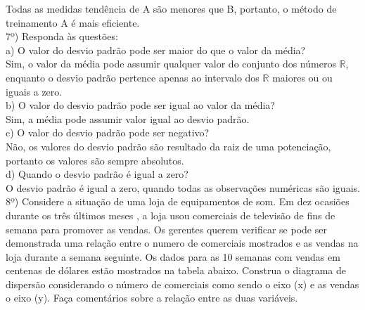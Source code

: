 \documentclass[12pt,a4paper]{article}
\begin{document}
	\vspace{0.5cm}
	Todas as medidas tendência de A são menores que B, portanto, o método de treinamento A é mais eficiente.
	\vspace{1cm}\\
	7º) Responda às questões:\\
	a) O valor do desvio padrão pode ser maior do que o valor da média?
	\vspace{0.5cm}\\
	Sim, o valor da média pode assumir qualquer valor do conjunto dos números  $\mathbb{R}$, enquanto o desvio padrão pertence apenas ao intervalo dos $\mathbb{R}$ maiores ou ou iguais a zero.
	\vspace{1cm}\\
	b) O valor do desvio padrão pode ser igual ao valor da média?
	\vspace{0.5cm}\\
	Sim, a média pode assumir valor igual ao desvio padrão.
	\vspace{1cm}\\
	c) O valor do desvio padrão pode ser negativo?
	\vspace{0.5cm}\\
	Não, os valores do desvio padrão são resultado da  raiz de uma potenciação, portanto os valores são sempre absolutos.
	\vspace{1cm}\\
	d) Quando o desvio padrão é igual a zero?
	\vspace{0.5cm}\\
	O desvio padrão é igual a zero, quando todas as observações numéricas são iguais.
	\vspace{1cm}\\
	8º) Considere a situação de uma loja de equipamentos de som. Em dez ocasiões durante os	três últimos meses , a loja usou comerciais de televisão de fins de semana para promover
	as vendas. Os gerentes querem verificar se pode ser demonstrada uma relação entre o	numero de comerciais mostrados e as vendas na loja durante a semana seguinte. Os dados para as 10 semanas com vendas em centenas de dólares estão mostrados na tabela abaixo.	Construa o diagrama de dispersão considerando o número de comerciais como sendo o	eixo (x) e as vendas o eixo (y). Faça comentários sobre a relação entre as duas variáveis.
\end{document}
